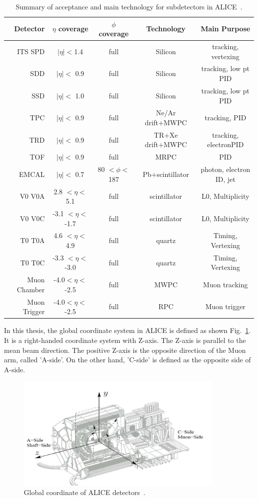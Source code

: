 \begin{table}[!htb]
  \centering
  \small
    \begin{tabular}{|r|c|c|c|c|} \hline
    Detector & $\eta$ coverage  & $\phi$ coverage & Technology & Main Purpose \\ \hline
    ITS SPD & $|\eta| < $1.4 & full & Silicon & tracking, vertexing \\
    SDD & $|\eta| < $ 0.9  & full & Silicon & tracking, low pt PID \\
    SSD & $|\eta| < $ 1.0  & full & Silicon & tracking, low pt PID \\
    TPC & $|\eta| < $ 0.9  & full & Ne/Ar drift+MWPC & tracking, PID \\
    TRD & $|\eta| < $ 0.9  & full & TR+Xe drift+MWPC & tracking, electronPID \\
    TOF & $|\eta| < $ 0.9  & full & MRPC & PID \\
    EMCAL & $|\eta| < $ 0.7 & 80  $<\phi<$ 187  & Pb+scintillator & photon, electron ID, jet \\
    V0 V0A& 2.8 $< \eta < $ 5.1 & full & scintillator & L0, Multiplicity \\
    V0 V0C& -3.1 $< \eta < $ -1.7 & full & scintillator & L0, Multiplicity \\
    T0 T0A& 4.6 $< \eta < $ 4.9 & full & quartz & Timing, Vertexing \\ 
    T0 T0C& -3.3 $< \eta < $ -3.0 & full & quartz & Timing, Vertexing \\ 
    Muon Chamber & -4.0$<\eta < $-2.5 & full &MWPC &Muon tracking \\	  
    Muon Trigger & -4.0$<\eta < $-2.5 & full &RPC &Muon trigger \\ \hline  	     
      \end{tabular}
 \caption{ Summary of acceptance and main technology for subdetectors in ALICE~\cite{bib_aprrun1}.}
  \label{table_3_alicedet}
\end{table}

In this thesis, the global coordinate system in ALICE is defined as shown Fig.~\ref{fig_3_alicecood}. 
It is a right-handed coordinate system with Z-axis. 
The Z-axis is parallel to the mean beam direction. 
The positive Z-axis is the opposite direction of the Muon arm, called 'A-side'. 
On the other hand, 'C-side' is defined as the opposite side of A-side. 
\begin{figure}[!h]
  \centering
  \includegraphics[width=10cm]{chap3/figure/ALICE/ALICE_Coordinate.png}
  \caption{Global coordinate of ALICE detectors~\cite{bib_aprv2}.}
  \label{fig_3_alicecood}
\end{figure}



